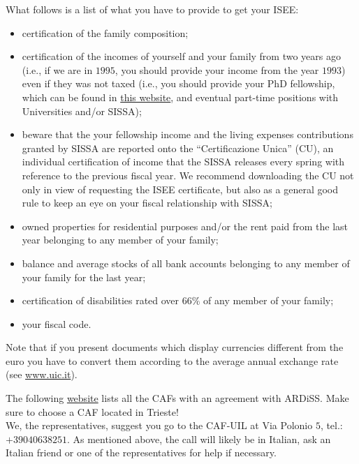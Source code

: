 \documentclass{sissavademecum}
\begin{document}
\begin{itemize}
    What follows is a list of what you have to provide to get your ISEE:
    \begin{itemize}
        \item certification of the family composition;
        \item certification of the incomes of yourself and your family from two years ago (i.e., if we are in $1995$, you should provide your income from the year $1993$) even if they was not taxed (i.e., you should provide your PhD fellowship, which can be found in \href{https://www.sissa.u-gov.it/u-gov-ru/bp/desktop.RU99CEDOLID_1914958969.RU99CEDOL/siaru/cedolini/cedolini_main.iface}{this website}, and eventual part-time positions with Universities and/or SISSA);
        \item beware that the your fellowship income and the living expenses contributions granted by SISSA are reported onto the ``Certificazione Unica'' (CU), an individual certification of income that the SISSA releases every spring with reference to the previous fiscal year. We recommend downloading the CU not only in view of requesting the ISEE certificate, but also as a general good rule to keep an eye on your fiscal relationship with SISSA;
        \item owned properties for residential purposes and/or the rent paid from the last year belonging to any member of your family;
        \item balance and average stocks of all bank accounts belonging to any member of your family for the last year;
        \item certification of disabilities rated over $66\%$ of any member of your family;
        \item your fiscal code.
    \end{itemize}
    Note that if you present documents which display currencies different from the euro you have to convert them according to the average annual exchange rate (see \url{www.uic.it}).
    
    The following \href{http://www.ardiss.fvg.it/contenuti.php?view=news&id=9518&tipo=evidenza}{website} lists all the CAFs with an agreement with ARDiSS.
    Make sure to choose a CAF located in Trieste!\\
    We, the representatives, suggest you go to the CAF-UIL at Via Polonio $5$, tel.: $+39040638251$. As mentioned above, the call will likely be in Italian, ask an Italian friend or one of the representatives for help if necessary.
\end{itemize}
\end{document}
